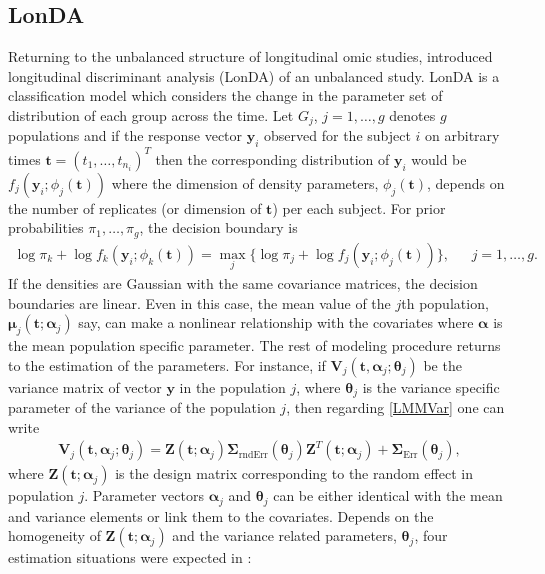 \documentclass[]{article}
\begin{document}
		\subsection{LonDA} 
		Returning to the unbalanced structure of longitudinal omic studies, \cite{Marshall2000} introduced longitudinal discriminant analysis (LonDA) of an unbalanced study. LonDA is a classification model which considers the change in the parameter set of distribution of each group across the time. Let $G_j$, $j=1,\ldots,g$ denotes $g$ populations and if the response vector $\mathbf{y}_i$ observed for the subject $i$ on arbitrary times $\mathbf{t}=(t_1,\ldots,t_{n_i})^T$ then the corresponding distribution of $\mathbf{y}_i$ would be $f_j(\mathbf{y}_i;\phi_j(\mathbf{t}))$ where the dimension of density parameters, $\phi_j(\mathbf{t})$, depends on the number of replicates (or dimension of $\mathbf{t}$) per each subject. For prior probabilities $\pi_1,\ldots,\pi_g$, the decision boundary \citep[][P. 102]{ELSII} is 
		\begin{eqnarray*}
			\log \pi_k +\log f_k(\mathbf{y}_i;\phi_k(\mathbf{t})) =\max_j\{	\log \pi_j +\log f_j(\mathbf{y}_i;\phi_j(\mathbf{t}))\}, ~~~~~~~j=1,\ldots,g. 
		\end{eqnarray*}
		If the densities are Gaussian with the same covariance matrices, the decision boundaries are linear. Even in this case, the mean value of the $j$th population, $\boldsymbol{\mu}_j(\mathbf{t};\boldsymbol{\alpha}_j)$ say, can make a nonlinear relationship with the covariates where $\boldsymbol{\alpha}$ is the mean population specific parameter. The rest of modeling procedure returns to the estimation of the parameters. For instance, if $\mathbf{V}_j(\mathbf{t},\boldsymbol{\alpha}_j;\boldsymbol{\theta}_j)$ be the variance matrix of vector $\mathbf{y}$ in the population $j$, where $\boldsymbol{\theta}_j$ is the variance specific parameter of the variance of the population $j$, then regarding \eqref{LMMVar} one can write
		\begin{eqnarray*}
			\mathbf{V}_j(\mathbf{t},\boldsymbol{\alpha}_j;\boldsymbol{\theta}_j)=\mathbf{Z}(\textbf{t};\boldsymbol{\alpha}_j)\boldsymbol{\Sigma}_{\mathrm{rndErr}}(\boldsymbol{\theta}_j)\mathbf{Z}^T(\textbf{t};\boldsymbol{\alpha}_j)+\boldsymbol{\Sigma}_{\mathrm{Err}}(\boldsymbol{\theta}_j),
		\end{eqnarray*}
		where $\mathbf{Z}(\textbf{t};\boldsymbol{\alpha}_j)$ is the design matrix corresponding to the random effect in population $j$. Parameter vectors $\boldsymbol{\alpha}_j$ and $\boldsymbol{\theta}_j$ can be either identical with the mean and variance elements or link them to the covariates. Depends on the homogeneity of $\mathbf{Z}(\textbf{t};\boldsymbol{\alpha}_j)$ and the variance related parameters, $\boldsymbol{\theta}_j$, four estimation situations were expected in \cite{Marshall2000}: 
\end{document}
